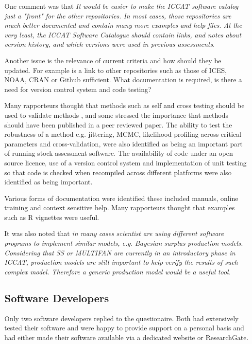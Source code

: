 \documentclass[a4paper,10pt]{article}
\begin{document}
One comment was that 
\textit{It would be easier to make the ICCAT software catalog just a "front" for the other repositories. In most cases, those repositories are much better documented and contain many more examples and help files. At the very least, the ICCAT Software Catalogue should contain links, and notes about version history, and which versions were used in previous assessments}.

Another issue is the relevance of current criteria and how should they be updated. For example is a link to other repositories such as those of ICES, NOAA,  CRAN or Github sufficient. What documentation is required, is there a need for version control system and code testing?

Many rapporteurs thought that methods such as self and cross testing should be used to validate methods \citep{deroba2014simulation}, and some stressed the importance that methods should have been published in a peer reviewed paper. The ability to test the robustness of a method e.g. jittering, MCMC, likelihood profiling across critical parameters and cross-validation, were also identified as being an important part of running stock assessment software. The availability of code under an open source licence,  use of a version control system and implementation of unit testing so that code is checked when recompiled across different platforms were also identified as being important.

Various forms of documentation were identified these included manuals, online training and context sensitive help. Many rapporteurs thought that examples such as R vignettes were useful.

It was also noted that \textit{in many cases scientist are using different software programs to implement similar models, e.g. Bayesian surplus production models. Considering that SS or MULTIFAN are currently in an introductory phase in ICCAT, production models are still important to help verify the results of such complex model. Therefore a generic production model would be a useful tool.}  

\subsection*{Software Developers}

Only two software developers replied to the questionaire. Both had extensively tested their software and were happy to provide support on a personal basis and had either made their software available via a dedicated website or ResearchGate.
\end{document}
